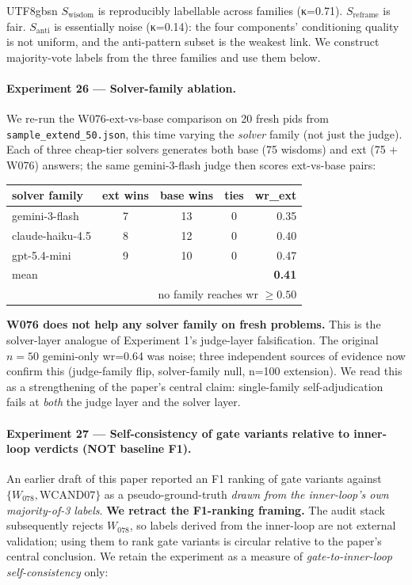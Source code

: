 \documentclass{article}
\begin{document}
\begin{CJK*}{UTF8}{gbsn}
\(S_{\text{wisdom}}\) is reproducibly labellable across families
(κ=0.71). \(S_{\text{reframe}}\) is fair. \(S_{\text{anti}}\) is
essentially noise (κ=0.14): the four components' conditioning quality
is not uniform, and the anti-pattern subset is the weakest link. We
construct majority-vote labels from the three families and use them
below.

\paragraph{Experiment 26 — Solver-family ablation.} We re-run the
W076-ext-vs-base comparison on 20 fresh pids from
\texttt{sample\_extend\_50.json}, this time varying the \emph{solver}
family (not just the judge). Each of three cheap-tier solvers
generates both base (75 wisdoms) and ext (75 + W076) answers; the
same gemini-3-flash judge then scores ext-vs-base pairs:

\begin{center}\small
\begin{tabular}{l c c c r}
  \toprule
  solver family & ext wins & base wins & ties & wr\_ext \\
  \midrule
  gemini-3-flash     & 7  & 13 & 0 & 0.35 \\
  claude-haiku-4.5   & 8  & 12 & 0 & 0.40 \\
  gpt-5.4-mini       & 9  & 10 & 0 & 0.47 \\
  \midrule
  mean               &    &    &   & \textbf{0.41} \\
  \multicolumn{5}{r}{no family reaches wr \(\geq 0.50\)} \\
  \bottomrule
\end{tabular}
\end{center}

\textbf{W076 does not help any solver family on fresh problems.}
This is the solver-layer analogue of Experiment 1's judge-layer
falsification. The original \(n = 50\) gemini-only wr=0.64 was
noise; three independent sources of evidence now confirm this
(judge-family flip, solver-family null, n=100 extension). We read
this as a strengthening of the paper's central claim: single-family
self-adjudication fails at \emph{both} the judge layer and the
solver layer.

\paragraph{Experiment 27 — Self-consistency of gate variants
relative to inner-loop verdicts (NOT baseline F1).}
\label{sec:exp27}
An earlier draft of this paper reported an F1 ranking of gate variants
against \(\{W_{078}, \text{WCAND07}\}\) as a pseudo-ground-truth
\emph{drawn from the inner-loop's own majority-of-3 labels}.
\textbf{We retract the F1-ranking framing.} The audit stack
subsequently rejects \(W_{078}\), so labels derived from the
inner-loop are not external validation; using them to rank gate
variants is circular relative to the paper's central conclusion.
We retain the experiment as a measure of \emph{gate-to-inner-loop
self-consistency} only:


\end{CJK*}
\end{document}
